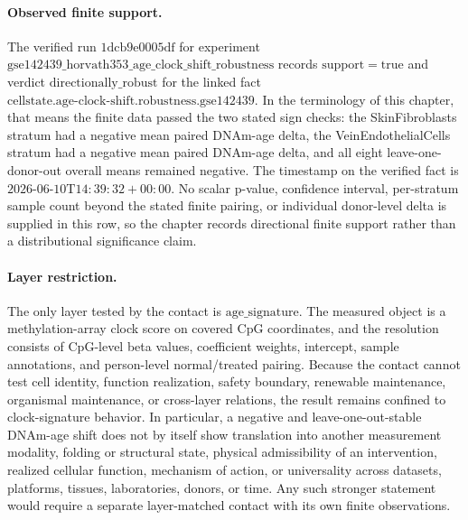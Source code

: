 \paragraph{Observed finite support.}
The verified run $\mathrm{1dcb9e0005df}$ for experiment $\mathrm{gse142439\_horvath353\_age\_clock\_shift\_robustness}$ records $\mathrm{support}=\mathrm{true}$ and verdict $\mathrm{directionally\_robust}$ for the linked fact $\mathrm{cellstate.age\mbox{-}clock\mbox{-}shift.robustness.gse142439}$.  In the terminology of this chapter, that means the finite data passed the two stated sign checks: the SkinFibroblasts stratum had a negative mean paired DNAm-age delta, the VeinEndothelialCells stratum had a negative mean paired DNAm-age delta, and all eight leave-one-donor-out overall means remained negative.  The timestamp on the verified fact is $2026\mbox{-}06\mbox{-}10\mathrm{T}14{:}39{:}32{+}00{:}00$.  No scalar p-value, confidence interval, per-stratum sample count beyond the stated finite pairing, or individual donor-level delta is supplied in this row, so the chapter records directional finite support rather than a distributional significance claim.

\paragraph{Layer restriction.}
The only layer tested by the contact is $\mathrm{age\_signature}$.  The measured object is a methylation-array clock score on covered CpG coordinates, and the resolution consists of CpG-level beta values, coefficient weights, intercept, sample annotations, and person-level normal/treated pairing.  Because the contact cannot test cell identity, function realization, safety boundary, renewable maintenance, organismal maintenance, or cross-layer relations, the result remains confined to clock-signature behavior.  In particular, a negative and leave-one-out-stable DNAm-age shift does not by itself show translation into another measurement modality, folding or structural state, physical admissibility of an intervention, realized cellular function, mechanism of action, or universality across datasets, platforms, tissues, laboratories, donors, or time.  Any such stronger statement would require a separate layer-matched contact with its own finite observations.


